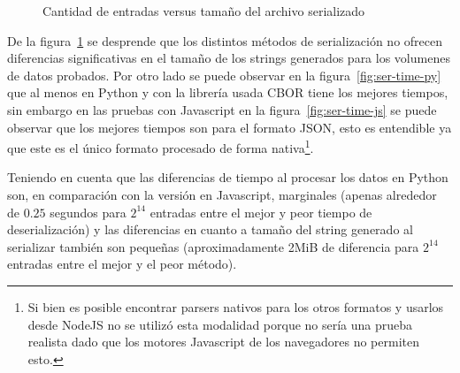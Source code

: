 \begin{figure}
    \centering
    \begin{framed}
    \end{framed}
    \caption{Cantidad de entradas versus tamaño del archivo serializado}
    \label{fig:ser-size}
\end{figure}

De la figura~\ref{fig:ser-size} se desprende que los distintos métodos de
serialización no ofrecen diferencias significativas en el tamaño de los
strings generados para los volumenes de datos probados. Por otro lado
se puede observar en la figura~\ref{fig:ser-time-py} que al menos en
Python y con la librería usada CBOR tiene los mejores tiempos, sin
embargo en las pruebas con Javascript en la figura~\ref{fig:ser-time-js}
se puede observar que los mejores tiempos son para el formato JSON,
esto es entendible ya que este es el único formato procesado de forma
nativa\footnote{Si bien es posible encontrar parsers nativos para los
otros formatos y usarlos desde NodeJS no se utilizó esta modalidad porque
no sería una prueba realista dado que los motores Javascript de los
navegadores no permiten esto.}.

Teniendo en cuenta que las diferencias de tiempo al procesar los datos
en Python son, en comparación con la versión en Javascript, marginales
(apenas alrededor de $0.25$ segundos para $2^{14}$
entradas entre el mejor y peor tiempo de deserialización) y las diferencias
en cuanto a tamaño del string generado al
serializar también son pequeñas (aproximadamente 2MiB de diferencia para
$2^{14}$ entradas entre el mejor y el peor método).


